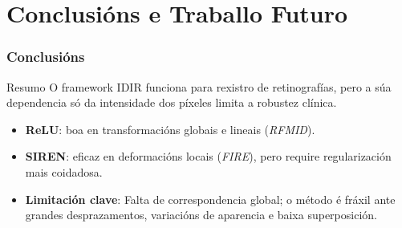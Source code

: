 \documentclass[xcolor=dvipsnames]{beamer}
\begin{document}
\section{Conclusións e Traballo Futuro}

\begin{frame}
    \frametitle{Conclusións}

    \begin{block}{Resumo}
        O framework IDIR funciona para rexistro de retinografías, pero a súa dependencia só da intensidade dos píxeles limita a robustez clínica.
    \end{block}

    \begin{itemize}
        \item \textbf{ReLU}: boa en transformacións globais e lineais (\textit{RFMID}).
        \item \textbf{SIREN}: eficaz en deformacións locais (\textit{FIRE}), pero require regularización mais coidadosa.
        \item \textbf{Limitación clave}: Falta de correspondencia global; o método é fráxil ante grandes desprazamentos, variacións de aparencia e baixa superposición.
    \end{itemize}

    \end{frame}
\end{document}
